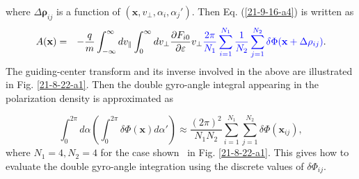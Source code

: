 \documentclass{article}
\newcommand{\tmcolor}[2]{{\color{#1}{#2}}}
\begin{document}
where $\Delta \mathbf{\rho}_{i j}$ is a function of $(\mathbf{x}, v_{\perp},
\alpha_i, \alpha_j')$. Then Eq. (\ref{21-9-16-a4}) is written as
\begin{eqnarray}
  A (\mathbf{x}) & = & - \frac{q}{m}  \int_{- \infty}^{\infty} d v_{\parallel}
  \int_0^{\infty} d v_{\perp} \frac{\partial F_{i 0}}{\partial \varepsilon}
  v_{\perp} \tmcolor{blue}{\frac{2 \pi}{N_1} \sum_{i = 1}^{N_1} \frac{1}{N_2} 
  \sum_{j = 1}^{N_2} \delta \Phi (\mathbf{x} + \Delta \mathbf{\rho}_{i j})} . 
  \label{22-11-8-1}
\end{eqnarray}
The guiding-center transform and its inverse involved in the above are
illustrated in Fig. \ref{21-8-22-a1}. Then the double gyro-angle integral
appearing in the polarization density is approximated as


\begin{equation}
  \label{21-9-2-a1} \int_0^{2 \pi} d \alpha \left( \int_0^{2 \pi} \delta \Phi
  (\mathbf{x}) d \alpha' \right) \approx \frac{(2 \pi)^2}{N_1 N_2}  \sum_{i =
  1}^{N_1} \sum_{j = 1}^{N_2} \delta \Phi (\mathbf{x}_{i j}),
\end{equation}
where $N_1 = 4, N_2 = 4$ for the case shown \ in Fig. \ref{21-8-22-a1}. This
gives how to evaluate the double gyro-angle integration using the discrete
values of $\delta \Phi_{i j}$.

\

\
\end{document}
